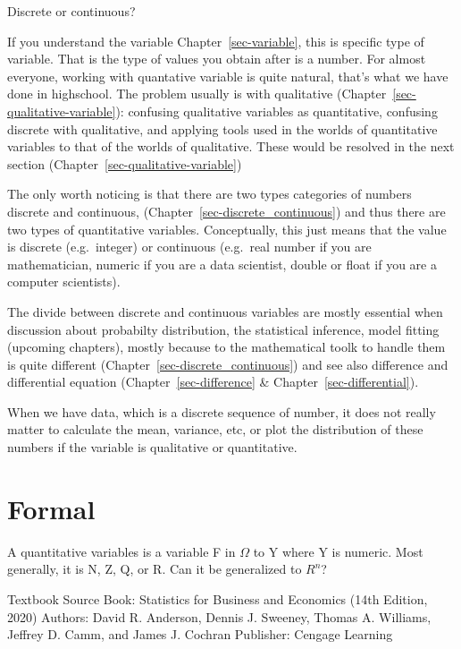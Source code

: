 \documentclass[
  letterpaper,
  DIV=11,
  numbers=noendperiod]{scrreprt}
\begin{document}
Discrete or continuous?

If you understand the variable Chapter~\ref{sec-variable}, this is
specific type of variable. That is the type of values you obtain after
is a number. For almost everyone, working with quantative variable is
quite natural, that's what we have done in highschool. The problem
usually is with qualitative (Chapter~\ref{sec-qualitative-variable}):
confusing qualitative variables as quantitative, confusing discrete with
qualitative, and applying tools used in the worlds of quantitative
variables to that of the worlds of qualitative. These would be resolved
in the next section (Chapter~\ref{sec-qualitative-variable})

The only worth noticing is that there are two types categories of
numbers discrete and continuous, (Chapter~\ref{sec-discrete_continuous})
and thus there are two types of quantitative variables. Conceptually,
this just means that the value is discrete (e.g.~integer) or continuous
(e.g.~real number if you are mathematician, numeric if you are a data
scientist, double or float if you are a computer scientists).

The divide between discrete and continuous variables are mostly
essential when discussion about probabilty distribution, the statistical
inference, model fitting (upcoming chapters), mostly because to the
mathematical toolk to handle them is quite different
(Chapter~\ref{sec-discrete_continuous}) and see also difference and
differential equation (Chapter~\ref{sec-difference} \&
Chapter~\ref{sec-differential}).

When we have data, which is a discrete sequence of number, it does not
really matter to calculate the mean, variance, etc, or plot the
distribution of these numbers if the variable is qualitative or
quantitative.

\section*{Formal}\label{formal-16}


A quantitative variables is a variable F in \(\Omega\) to Y where Y is
numeric. Most generally, it is N, Z, Q, or R. Can it be generalized to
\(R^n\)?

Textbook Source Book: Statistics for Business and Economics (14th
Edition, 2020) Authors: David R. Anderson, Dennis J. Sweeney, Thomas A.
Williams, Jeffrey D. Camm, and James J. Cochran Publisher: Cengage
Learning
\end{document}
